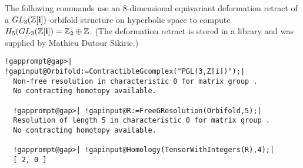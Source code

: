 \documentclass[a4paper,11pt]{report}
\begin{document}
{{ The following commands use an $8$-dimensional equivariant deformation retract of a $GL_3(\mathbb Z[{\bf i}])$-orbifold structure on hyperbolic space to compute $H_5(GL_3({\mathbb Z}[{\bf i}]) = \mathbb Z_2\oplus \mathbb Z$. (The deformation retract is stored in a library and was supplied by Mathieu
Dutour Sikiric.) 
\begin{Verbatim}[commandchars=!@|,fontsize=\small,frame=single,label=Example]
  !gapprompt@gap>| !gapinput@Orbifold:=ContractibleGcomplex("PGL(3,Z[i])");|
  Non-free resolution in characteristic 0 for matrix group . 
  No contracting homotopy available. 
  
  !gapprompt@gap>| !gapinput@R:=FreeGResolution(Orbifold,5);|
  Resolution of length 5 in characteristic 0 for matrix group . 
  No contracting homotopy available. 
  
  !gapprompt@gap>| !gapinput@Homology(TensorWithIntegers(R),4);|
  [ 2, 0 ]
  
\end{Verbatim}
 }

 }

 
\end{document}
